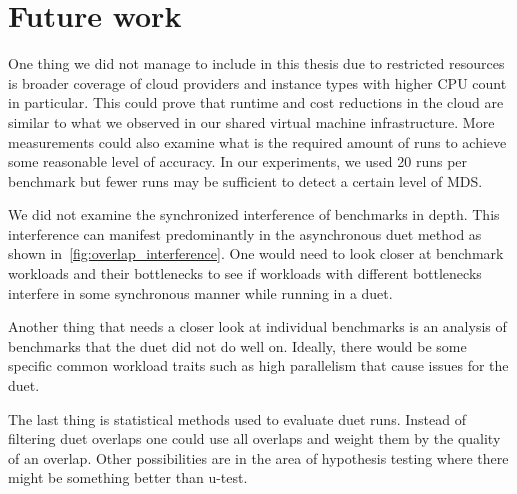 \section{Future work}
One thing we did not manage to include in this thesis due to restricted resources is broader coverage of cloud providers and instance types with higher CPU count in particular.
This could prove that runtime and cost reductions in the cloud are similar to what we observed in our shared virtual machine infrastructure.
More measurements could also examine what is the required amount of runs to achieve some reasonable level of accuracy.
In our experiments, we used 20 runs per benchmark but fewer runs may be sufficient to detect a certain level of MDS.

We did not examine the synchronized interference of benchmarks in depth.
This interference can manifest predominantly in the asynchronous duet method as shown in~\cref{fig:overlap_interference}.
One would need to look closer at benchmark workloads and their bottlenecks to see if workloads with different bottlenecks interfere in some synchronous manner while running in a duet.

Another thing that needs a closer look at individual benchmarks is an analysis of benchmarks that the duet did not do well on.
Ideally, there would be some specific common workload traits such as high parallelism that cause issues for the duet.

The last thing is statistical methods used to evaluate duet runs.
Instead of filtering duet overlaps one could use all overlaps and weight them by the quality of an overlap.
Other possibilities are in the area of hypothesis testing where there might be something better than \mbox{u-test}.
